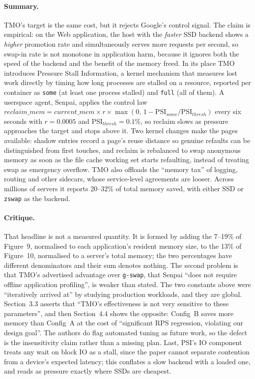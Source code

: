 \paragraph{Summary.}
TMO's target is the same cost, but it rejects Google's control signal. The claim is
empirical: on the Web application, the host with the \emph{faster} SSD backend shows a
\emph{higher} promotion rate and simultaneously serves more requests per second, so
swap-in rate is not monotone in application harm, because it ignores both the speed of
the backend and the benefit of the memory freed. In its place TMO introduces Pressure
Stall Information, a kernel mechanism that measures lost work directly by timing how
long processes are stalled on a resource, reported per container as \texttt{some} (at
least one process stalled) and \texttt{full} (all of them). A userspace agent, Senpai,
applies the control law
$reclaim\_mem = current\_mem \times r \times \max(0,\,1-\mathrm{PSI}_{some}/
\mathrm{PSI}_{thresh})$ every six seconds with $r=0.0005$ and
$\mathrm{PSI}_{thresh}=0.1\%$, so reclaim slows as pressure approaches the target and
stops above it. Two kernel changes make the pages available: shadow entries record a
page's reuse distance so genuine refaults can be distinguished from first touches, and
reclaim is rebalanced to swap anonymous memory as soon as the file cache working set
starts refaulting, instead of treating swap as emergency overflow. TMO also offloads the
``memory tax'' of logging, routing and other sidecars, whose service-level agreements are
looser. Across millions of servers it reports 20--32\% of total memory saved, with
either SSD or \texttt{zswap} as the backend.

\paragraph{Critique.}
That headline is not a measured quantity. It is formed by adding the 7--19\% of
Figure~9, normalised to each application's resident memory size, to the 13\% of
Figure~10, normalised to a server's total memory; the two percentages have different
denominators and their sum denotes nothing. The second problem is that TMO's advertised
advantage over \texttt{g-swap}, that Senpai ``does not require offline application
profiling'', is weaker than stated. The two constants above were ``iteratively arrived
at'' by studying production workloads, and they are global. Section~3.3 asserts that
``TMO's effectiveness is not very sensitive to these parameters'', and then Section~4.4
shows the opposite: Config~B saves more memory than Config~A at the cost of
``significant RPS regression, violating our design goal''. The authors do flag automated
tuning as future work, so the defect is the insensitivity claim rather than a missing
plan. Last, PSI's IO component treats any wait on block IO as a stall, since the paper
cannot separate contention from a device's expected latency; this conflates a slow
backend with a loaded one, and reads as pressure exactly where SSDs are cheapest.

